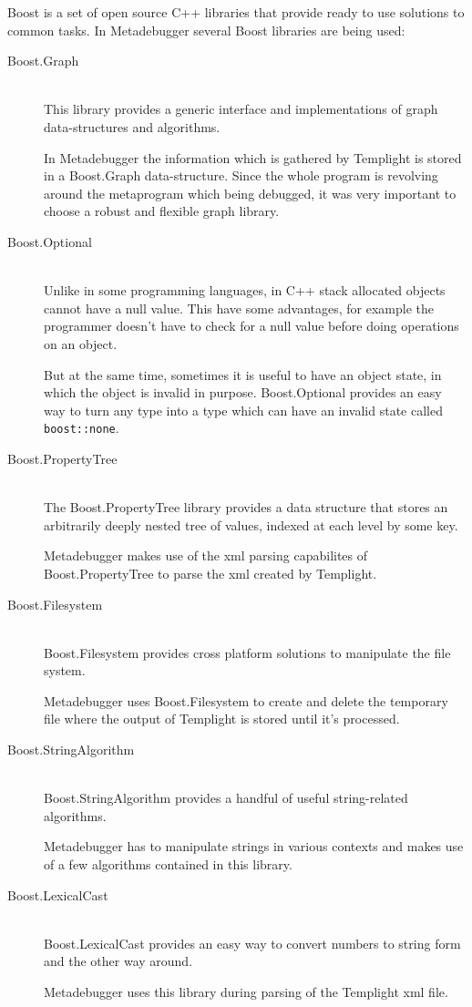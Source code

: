 Boost is a set of open source C++ libraries that provide ready to use solutions
to common tasks. In Metadebugger several Boost libraries are being used:
\begin{description}
    \item[Boost.Graph] \hfill \\
        This library provides a generic interface and implementations of graph
        data-structures and algorithms.

        In Metadebugger the information which is gathered by Templight is
        stored in a Boost.Graph data-structure. Since the whole program is
        revolving around the metaprogram which being debugged, it was very
        important to choose a robust and flexible graph library.
    \item[Boost.Optional] \hfill \\
        Unlike in some programming languages, in C++ stack allocated objects
        cannot have a null value. This have some advantages, for example the
        programmer doesn't have to check for a null value before doing
        operations on an object.

        But at the same time, sometimes it is useful to have an object state,
        in which the object is invalid in purpose. Boost.Optional provides an
        easy way to turn any type into a type which can have an invalid state
        called \lstinline|boost::none|.
    \item[Boost.PropertyTree] \hfill \\
        The Boost.PropertyTree library provides a data structure that stores an
        arbitrarily deeply nested tree of values, indexed at each level by some
        key.

        Metadebugger makes use of the xml parsing capabilites of
        Boost.PropertyTree to parse the xml created by Templight.
    \item[Boost.Filesystem] \hfill \\
        Boost.Filesystem provides cross platform solutions to manipulate the
        file system.

        Metadebugger uses Boost.Filesystem to create and delete the temporary
        file where the output of Templight is stored until it's processed.
    \item[Boost.StringAlgorithm] \hfill \\
        Boost.StringAlgorithm provides a handful of useful string-related
        algorithms.

        Metadebugger has to manipulate strings in various contexts and makes
        use of a few algorithms contained in this library.
    \item[Boost.LexicalCast] \hfill \\
        Boost.LexicalCast provides an easy way to convert numbers to string
        form and the other way around.

        Metadebugger uses this library during parsing of the Templight xml
        file.
\end{description}

